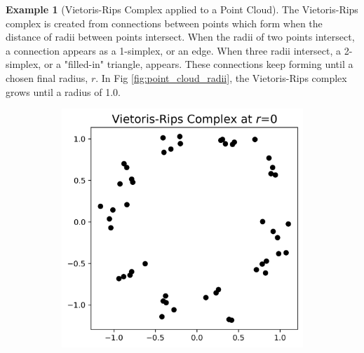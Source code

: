 \documentclass[ma]{uncgdissertationexp}
\theoremstyle{plain}
\theoremstyle{definition}
\newtheorem{example}[theorem]{Example}
\theoremstyle{remark}
\begin{document}
\newpage 
\begin{example}[Vietoris-Rips Complex applied to a Point Cloud]
\par The Vietoris-Rips complex is created from connections between points which form when the distance of radii between points intersect. When the radii of two points intersect, a connection appears as a 1-simplex, or an edge. When three radii intersect, a 2-simplex, or a "filled-in" triangle, appears. These connections keep forming until a chosen final radius, $r$. In Fig \ref{fig:point_cloud_radii}, the Vietoris-Rips complex grows until a radius of 1.0.
\begin{figure}[H]
    \centering
    \begin{subfigure}[b]{0.22\textwidth}
        \centering
        \includegraphics[width=\textwidth]{point_cloud_plot_r0.png}
    \end{subfigure}
    \hfill
    \begin{subfigure}[b]{0.22\textwidth}
        \centering

\end{subfigure}
\end{figure}
\end{example}
\end{document}
